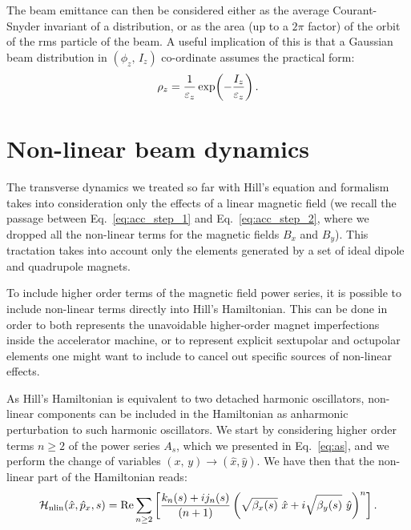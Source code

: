 The beam emittance can then be considered either as the average Courant-Snyder invariant of a distribution, or as the area (up to a $2\pi$ factor) of the orbit of the rms particle of the beam. A useful implication of this is that a Gaussian beam distribution in $(\phi_z,\,I_z)$ co-ordinate assumes the practical form:
%
\begin{equation}
\rho_z = \frac{1}{\varepsilon_z}\exp(-\frac{I_z}{\varepsilon_z})\,.
\end{equation}
%



\section{Non-linear beam dynamics}\label{sec:non-linear}

The transverse dynamics we treated so far with Hill's equation and formalism takes into consideration only the effects of a linear magnetic field (we recall the passage between Eq.~\eqref{eq:acc_step_1} and Eq.~\eqref{eq:acc_step_2}, where we dropped all the non-linear terms for the magnetic fields $B_x$ and $B_y$). This tractation takes into account only the elements generated by a set of ideal dipole and quadrupole magnets.

To include higher order terms of the magnetic field power series, it is possible to include non-linear terms directly into Hill's Hamiltonian. This can be done in order to both represents the unavoidable higher-order magnet imperfections inside the accelerator machine, or to represent explicit sextupolar and octupolar elements one might want to include to cancel out specific sources of non-linear effects. 

As Hill's Hamiltonian is equivalent to two detached harmonic oscillators, non-linear components can be included in the Hamiltonian as anharmonic perturbation to such harmonic oscillators. We start by considering higher order terms $n \ge 2$ of the power series $A_s$, which we presented in Eq.~\eqref{eq:as}, and we perform the change of variables $(x,\,y) \to (\hat x, \hat y)$. We have then that the non-linear part of the Hamiltonian reads:
%
\begin{equation}
    \mathcal{H}_\text{nlin}(\hat x, \hat p_x, s) = \Re \sum_{n\ge 2} \qty[\frac{k_n(s) + ij_n(s)}{(n+1)} \left(\sqrt{\beta_x(s)}\ \hat x + i\sqrt{\beta_y(s)}\ \hat y\right)^n]\,.
\end{equation}  

